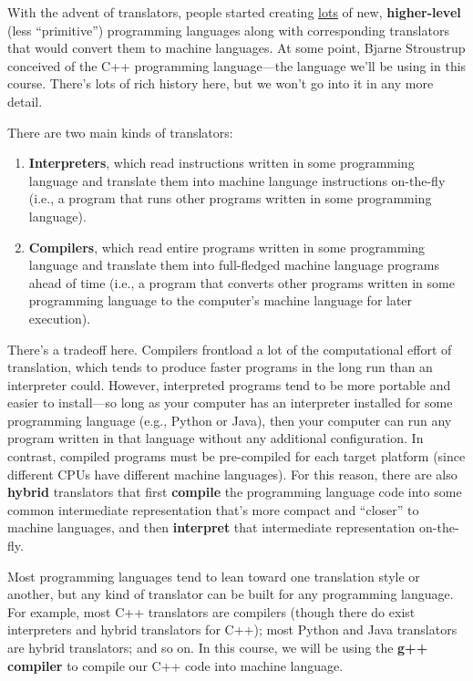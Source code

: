 \documentclass{article}
\begin{document}
With the advent of translators, people started creating \ul{lots} of new, \textbf{higher-level} (less ``primitive'') programming languages along with corresponding translators that would convert them to machine languages. At some point, Bjarne Stroustrup conceived of the C++ programming language---the language we'll be using in this course. There's lots of rich history here, but we won't go into it in any more detail.

There are two main kinds of translators:
\begin{enumerate}
    \item \textbf{Interpreters}, which read instructions written in some programming language and translate them into machine language instructions on-the-fly (i.e., a program that runs other programs written in some programming language).
    \item \textbf{Compilers}, which read entire programs written in some programming language and translate them into full-fledged machine language programs ahead of time (i.e., a program that converts other programs written in some programming language to the computer's machine language for later execution).
\end{enumerate}

There's a tradeoff here. Compilers frontload a lot of the computational effort of translation, which tends to produce faster programs in the long run than an interpreter could. However, interpreted programs tend to be more portable and easier to install---so long as your computer has an interpreter installed for some programming language (e.g., Python or Java), then your computer can run any program written in that language without any additional configuration. In contrast, compiled programs must be pre-compiled for each target platform (since different CPUs have different machine languages). For this reason, there are also \textbf{hybrid} translators that first \textbf{compile} the programming language code into some common intermediate representation that's more compact and ``closer'' to machine languages, and then \textbf{interpret} that intermediate representation on-the-fly.

Most programming languages tend to lean toward one translation style or another, but any kind of translator can be built for any programming language. For example, most C++ translators are compilers (though there do exist interpreters and hybrid translators for C++); most Python and Java translators are hybrid translators; and so on. In this course, we will be using the \textbf{g++ compiler} to compile our C++ code into machine language.
\end{document}
